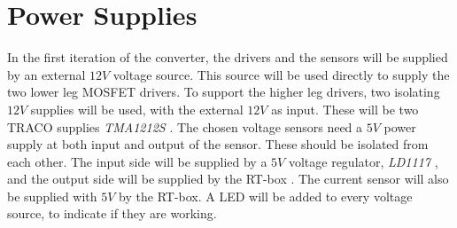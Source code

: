 \section{Power Supplies}\label{power_supplies}
In the first iteration of the converter, the drivers and the sensors will be supplied by an external $12V$ voltage source. This source will be used directly to supply the two lower leg MOSFET drivers. To support the higher leg drivers, two isolating $12V$ supplies will be used, with the external $12V$ as input. These will be two TRACO supplies \textit{TMA1212S} \cite{traco_tma1212}. The chosen voltage sensors need a $5V$ power supply at both input and output of the sensor. These should be isolated from each other. The input side will be supplied by a $5V$ voltage regulator, \textit{LD1117} \cite{LD1117}, and the output side will be supplied by the RT-box . The current sensor will also be supplied with $5V$ by the RT-box. A LED will be added to every voltage source, to indicate if they are working.